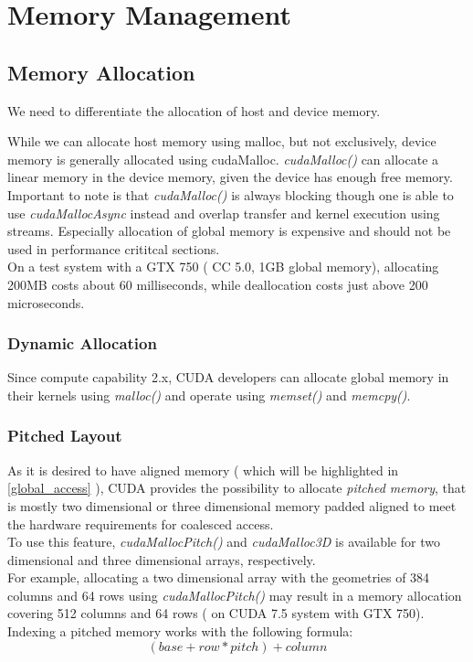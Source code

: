 \section{Memory Management}
\label{sec:management}
\subsection{Memory Allocation}
\label{mem_alloc}
We need to differentiate the allocation of host and device memory.

While we can allocate host memory using malloc, but not exclusively, device memory is generally allocated using cudaMalloc.
\emph{cudaMalloc()} can allocate a linear memory in the device memory, given the device has enough free memory.
Important to note is that \emph{cudaMalloc()} is always blocking though one is able to use \emph{cudaMallocAsync} instead and overlap transfer and kernel execution using streams.
Especially allocation of global memory is expensive and should not be used in performance crititcal sections.\\
On a test system with a GTX 750 ( CC 5.0, 1GB global memory), allocating 200MB costs about 60 milliseconds, while deallocation costs just above 200 microseconds.
\subsubsection{Dynamic Allocation}
Since compute capability 2.x, CUDA developers can allocate global memory in their kernels using \emph{malloc()} and operate using \emph{memset()} and \emph{memcpy()}.
\subsubsection{Pitched Layout}
\label{pitch}
As it is desired to have aligned memory ( which will be highlighted in \ref{global_access} ), CUDA provides the possibility to allocate \emph{pitched memory},
that is mostly two dimensional or three dimensional memory padded aligned to meet the hardware requirements for coalesced access.\\
To use this feature, \emph{cudaMallocPitch()} and \emph{cudaMalloc3D} is available for two dimensional and three dimensional arrays, respectively.\\
For example, allocating a two dimensional array with the geometries of 384 columns and 64 rows using \emph{cudaMallocPitch()} may result in a memory allocation
covering 512 columns and 64 rows ( on CUDA 7.5 system with GTX 750).\\
Indexing a pitched memory works with the following formula:\\
$$ (base + row * pitch) + column$$\\
